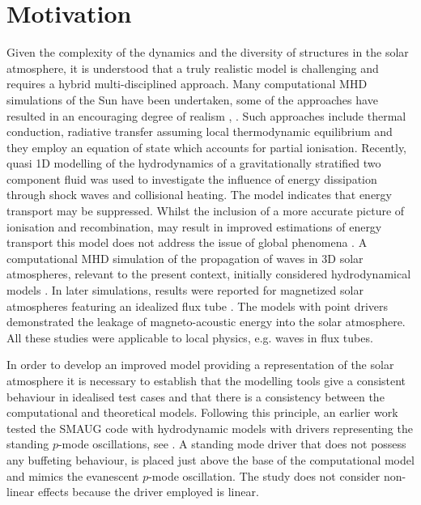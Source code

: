 \documentclass[physics,article,submit,pdftex,moreauthors]{Definitions/mdpi}
\begin{document}
\section{Motivation}
\label{sec:motivation}

Given the complexity of the dynamics and the diversity of structures in the solar atmosphere, it is understood that a truly realistic model is challenging and  requires a hybrid multi-disciplined approach. Many computational MHD simulations of the Sun have been undertaken, some of the approaches have resulted in an encouraging degree of realism  \cite{Vogler2005}, \cite{Gudiksen2011}. Such approaches include thermal conduction, radiative transfer assuming local thermodynamic equilibrium and they employ an equation of state which accounts for partial ionisation.  Recently, quasi 1D modelling of the hydrodynamics of a gravitationally stratified two component fluid was used to investigate the influence of energy dissipation through shock waves and collisional heating. The model indicates that energy transport may be suppressed. Whilst the inclusion of a more accurate picture of ionisation and recombination, may result in improved estimations of energy transport this model does not address the issue of global phenomena \cite{Zhang2021}. A computational MHD simulation of the propagation of waves in 3D solar atmospheres, relevant to the present context, initially considered hydrodynamical models \cite{Fedun2009a}.  In later simulations, results were reported for magnetized solar atmospheres featuring an idealized flux tube \cite{Fedun2009b} \cite{Vigeesh2012}. The models with point drivers demonstrated the leakage of magneto-acoustic energy into the solar atmosphere. All these studies were applicable to local physics, e.g. waves in flux tubes.   

In order to develop an improved model providing a representation of the solar atmosphere it is necessary to establish that the modelling tools give a consistent behaviour in idealised test cases and that there is a consistency between the computational and theoretical models.  Following this principle, an earlier work tested the SMAUG code with hydrodynamic models with drivers representing the standing $p$-mode oscillations, see \cite{Griffiths2018b}. A standing mode driver that does not possess any buffeting behaviour, is placed just above the base of the computational model and mimics the evanescent $p$-mode oscillation. The study does not consider non-linear effects because the driver employed is linear.
\end{document}
